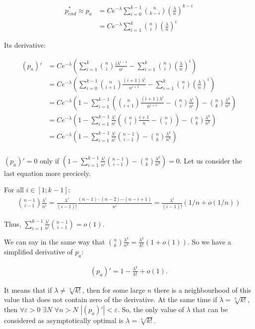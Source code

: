 \documentclass{article}
\begin{document}
\begin{align*}
 p_{end}^*  \approx p_a &= Ce^{-\lambda}\sum\limits_{i = 0}^{k - 1} \binom{n}{k - i} \left( \frac{\lambda}{n} \right)^{k - i} \\
                        &= Ce^{-\lambda}\sum\limits_{i = 1}^{k} \binom{n}{i} \left( \frac{\lambda}{n} \right)^{i}
\end{align*}

Its derivative:

\begin{align*}
(p_a)' &= Ce^{-\lambda}(\sum\limits_{i = 1}^{k} \binom{n}{i} \frac{i\lambda^{i - 1}}{n^i} - \sum\limits_{i = 1}^{k} \binom{n}{i} \left( \frac{\lambda}{n} \right)^{i}) \\
       &= Ce^{-\lambda}(\sum\limits_{i = 0}^{k - 1} \binom{n}{i + 1} \frac{(i + 1)\lambda^i}{n^{i + 1}} - \sum\limits_{i = 1}^{k} \binom{n}{i} \left( \frac{\lambda}{n} \right)^{i}) \\
       &= Ce^{-\lambda}\left(1 - \sum\limits_{i = 1}^{k - 1} \left(\binom{n}{i + 1} \frac{(i + 1)\lambda^{i}}{n^{i + 1}} - \binom{n}{i} \frac{\lambda^i}{n^i} \right) - \binom{n}{k} \frac{\lambda^k}{n^k} \right) \\
       &= Ce^{-\lambda}\left(1 - \sum\limits_{i = 1}^{k - 1} \frac{\lambda^i}{n^i} \left(\binom{n}{i} \frac{i + 1}{n} - \binom{n}{i} \right) - \binom{n}{k} \frac{\lambda^k}{n^k} \right) \\
       &= Ce^{-\lambda}\left(1 - \sum\limits_{i = 1}^{k - 1} \frac{\lambda^i}{n^i} \binom{n - 1}{i - 1} - \binom{n}{k} \frac{\lambda^k}{n^k} \right) \\
\end{align*}

$(p_a)' = 0$ only if $\left(1 - \sum\limits_{i = 1}^{k - 1} \frac{\lambda^i}{n^i} \binom{n - 1}{i - 1} - \binom{n}{k} \frac{\lambda^k}{n^k} \right) = 0$. Let us consider the last equation more precicely.

For all $i \in [1; k - 1]:$ 
\begin{align*}
  \binom{n - 1}{i - 1}\frac{\lambda^i}{n^i} = \frac{\lambda^i}{(i - 1)!} \frac{(n - 1)\cdot(n - 2)\cdots(n - i + 1)}{n^i} = \frac{\lambda^i}{(i - 1)!} (1/n + o(1/n))
\end{align*}

Thus, $\sum\limits_{i = 1}^{k - 1} \frac{\lambda^i}{n^i} \binom{n - 1}{i - 1} = o(1).$

We can say in the same way that $\binom{n}{k} \frac{\lambda^k}{n^k} = \frac{\lambda^k}{k!} (1 + o(1))$. So we have a simplified derivative of $p_a:$

\begin{align*}
(p_a)' = 1 - \frac{\lambda^k}{k!} + o(1).
\end{align*}

It means that if $\lambda \ne \sqrt[k]{k!}$, then for some large $n$ there is a neighbourhood of this value that does not contain zero of the derivative. At the same time if $\lambda = \sqrt[k]{k!}$, then $\forall \varepsilon > 0$ $\exists N$ $\forall n > N$ $|(p_a)'| < \varepsilon$. So, the only value of $\lambda$ that can be considered as asymptotically optimal is $\lambda = \sqrt[k]{k!}$.

\printbibliography
\end{document}
